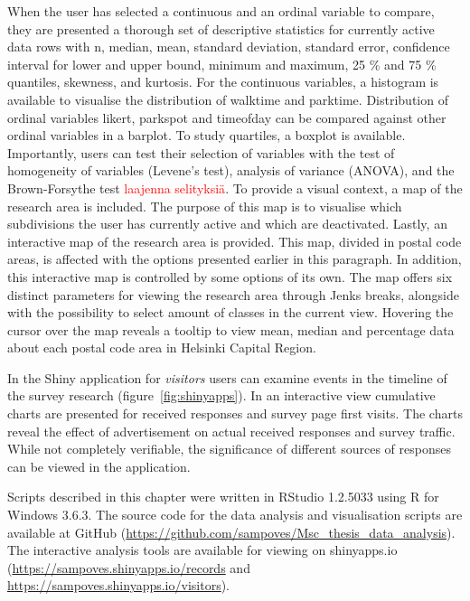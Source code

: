 When the user has selected a continuous and an ordinal variable to compare, they are presented a thorough set of descriptive statistics for currently active data rows with n, median, mean, standard deviation, standard error, confidence interval for lower and upper bound, minimum and maximum, 25 \% and 75 \% quantiles, skewness, and kurtosis. For the continuous variables, a histogram is available to visualise the distribution of walktime and parktime. Distribution of ordinal variables likert, parkspot and timeofday can be compared against other ordinal variables in a barplot. To study quartiles, a boxplot is available. Importantly, users can test their selection of variables with the test of homogeneity of variables (Levene's test), analysis of variance (ANOVA), and the Brown-Forsythe test \textcolor{red}{laajenna selityksiä}. To provide a visual context, a map of the research area is included. The purpose of this map is to visualise which subdivisions the user has currently active and which are deactivated. Lastly, an interactive map of the research area is provided. This map, divided in postal code areas, is affected with the options presented earlier in this paragraph. In addition, this interactive map is controlled by some options of its own. The map offers six distinct parameters for viewing the research area through Jenks breaks, alongside with the possibility to select amount of classes in the current view. Hovering the cursor over the map reveals a tooltip to view mean, median and percentage data about each postal code area in Helsinki Capital Region.

In the Shiny application for \textit{visitors} users can examine events in the timeline of the survey research (figure~\ref{fig:shinyapps}). In an interactive view cumulative charts are presented for received responses and survey page first visits. The charts reveal the effect of advertisement on actual received responses and survey traffic. While not completely verifiable, the significance of different sources of responses can be viewed in the application.

Scripts described in this chapter were written in RStudio 1.2.5033 using R for Windows 3.6.3. The source code for the data analysis and visualisation scripts are available at GitHub (\textcolor{blue}{\url{https://github.com/sampoves/Msc_thesis_data_analysis}}). The interactive analysis tools are available for viewing on shinyapps.io (\textcolor{blue}{\url{https://sampoves.shinyapps.io/records}} and  \textcolor{blue}{\url{https://sampoves.shinyapps.io/visitors}}). 